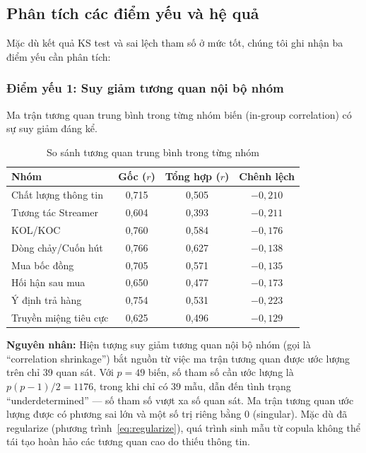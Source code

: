 \documentclass[12pt,a4paper]{article}
\begin{document}
\subsection{Phân tích các điểm yếu và hệ quả}

Mặc dù kết quả KS test và sai lệch tham số ở mức tốt, 
chúng tôi ghi nhận ba điểm yếu cần phân tích:

\subsubsection{Điểm yếu 1: Suy giảm tương quan nội bộ nhóm}

Ma trận tương quan trung bình trong từng nhóm biến 
(in-group correlation) có sự suy giảm đáng kể.

\begin{table}[H]
\centering
\caption{So sánh tương quan trung bình trong từng nhóm}
\label{tab:groupcorr}
\begin{tabular}{lccc}
\toprule
Nhóm & Gốc ($r$) & Tổng hợp ($r$) & Chênh lệch \\
\midrule
Chất lượng thông tin & 0,715 & 0,505 & $-0{,}210$ \\
Tương tác Streamer & 0,604 & 0,393 & $-0{,}211$ \\
KOL/KOC & 0,760 & 0,584 & $-0{,}176$ \\
Dòng chảy/Cuốn hút & 0,766 & 0,627 & $-0{,}138$ \\
Mua bốc đồng & 0,705 & 0,571 & $-0{,}135$ \\
Hối hận sau mua & 0,650 & 0,477 & $-0{,}173$ \\
Ý định trả hàng & 0,754 & 0,531 & $-0{,}223$ \\
Truyền miệng tiêu cực & 0,625 & 0,496 & $-0{,}129$ \\
\bottomrule
\end{tabular}
\end{table}

\textbf{Nguyên nhân:} 
Hiện tượng suy giảm tương quan nội bộ nhóm (gọi là ``correlation shrinkage'') 
bắt nguồn từ việc ma trận tương quan được ước lượng trên 
chỉ 39 quan sát. Với $p = 49$ biến, số tham số cần ước lượng là 
$p(p-1)/2 = 1176$, trong khi chỉ có 39 mẫu, dẫn đến 
tình trạng ``underdetermined'' — số tham số vượt xa số quan sát.
Ma trận tương quan ước lượng được có phương sai lớn 
và một số trị riêng bằng $0$ (singular). 
Mặc dù đã regularize (phương trình~\ref{eq:regularize}), 
quá trình sinh mẫu từ copula không thể tái tạo hoàn hảo 
các tương quan cao do thiếu thông tin.
\end{document}
